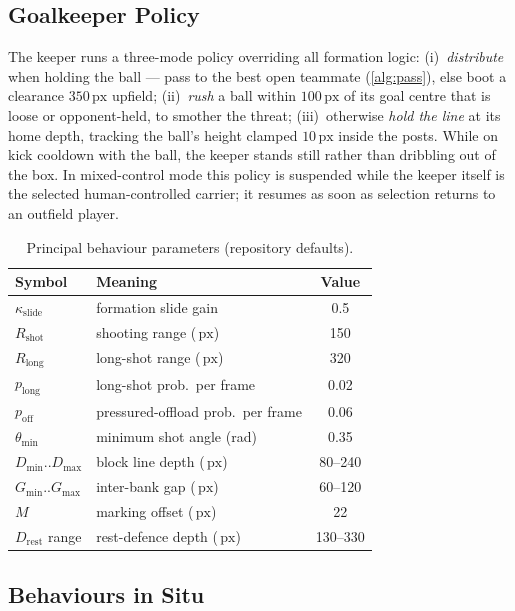 \documentclass[10pt,twocolumn]{article}
\newcommand{\px}{\ensuremath{\,\mathrm{px}}}
\begin{document}
\subsection{Goalkeeper Policy}\label{sec:keeper}

The keeper runs a three-mode policy overriding all formation logic:
(i)~\emph{distribute} when holding the ball --- pass to the best open
teammate (\cref{alg:pass}), else boot a clearance $350\px$ upfield;
(ii)~\emph{rush} a ball within $100\px$ of its goal centre that is loose or
opponent-held, to smother the threat; (iii)~otherwise \emph{hold the line}
at its home depth, tracking the ball's height clamped $10\px$ inside the
posts. While on kick cooldown with the ball, the keeper stands still
rather than dribbling out of the box. In mixed-control mode this policy is
suspended while the keeper itself is the selected human-controlled carrier;
it resumes as soon as selection returns to an outfield player.

\begin{table}[t]
\centering\small
\caption{Principal behaviour parameters (repository defaults).}
\label{tab:aiparams}
\begin{tabular}{@{}llS[table-format=3.2]@{}}
\toprule
Symbol & Meaning & {Value} \\
\midrule
$\kappa_{\text{slide}}$ & formation slide gain & 0.5 \\
$R_{\text{shot}}$ & shooting range (\px) & 150 \\
$R_{\text{long}}$ & long-shot range (\px) & 320 \\
$p_{\text{long}}$ & long-shot prob.\ per frame & 0.02 \\
$p_{\text{off}}$ & pressured-offload prob.\ per frame & 0.06 \\
$\theta_{\min}$ & minimum shot angle (rad) & 0.35 \\
$D_{\min}..D_{\max}$ & block line depth (\px) & {80--240} \\
$G_{\min}..G_{\max}$ & inter-bank gap (\px) & {60--120} \\
$M$ & marking offset (\px) & 22 \\
$D_{\text{rest}}$ range & rest-defence depth (\px) & {130--330} \\
\bottomrule
\end{tabular}
\end{table}

\subsection{Behaviours in Situ}\label{sec:screens}
\end{document}
